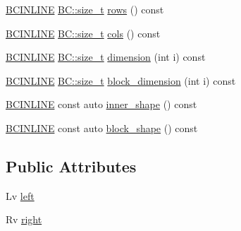\begin{DoxyCompactItemize}
\item 
\hyperlink{BlackCat__Common_8h_a6699e8b0449da5c0fafb878e59c1d4b1}{B\+C\+I\+N\+L\+I\+NE} \hyperlink{namespaceBC_a6007cbc4eeec401a037b558910a56173}{B\+C\+::size\+\_\+t} \hyperlink{structBC_1_1tensors_1_1exprs_1_1Binary__Expression_a4c8338db9038c96551365269e9797a55}{rows} () const 
\item 
\hyperlink{BlackCat__Common_8h_a6699e8b0449da5c0fafb878e59c1d4b1}{B\+C\+I\+N\+L\+I\+NE} \hyperlink{namespaceBC_a6007cbc4eeec401a037b558910a56173}{B\+C\+::size\+\_\+t} \hyperlink{structBC_1_1tensors_1_1exprs_1_1Binary__Expression_aa6792d643387514d8dbf521601686860}{cols} () const 
\item 
\hyperlink{BlackCat__Common_8h_a6699e8b0449da5c0fafb878e59c1d4b1}{B\+C\+I\+N\+L\+I\+NE} \hyperlink{namespaceBC_a6007cbc4eeec401a037b558910a56173}{B\+C\+::size\+\_\+t} \hyperlink{structBC_1_1tensors_1_1exprs_1_1Binary__Expression_ac4ad404ab4c236b4e5346ff2348122ad}{dimension} (int i) const 
\item 
\hyperlink{BlackCat__Common_8h_a6699e8b0449da5c0fafb878e59c1d4b1}{B\+C\+I\+N\+L\+I\+NE} \hyperlink{namespaceBC_a6007cbc4eeec401a037b558910a56173}{B\+C\+::size\+\_\+t} \hyperlink{structBC_1_1tensors_1_1exprs_1_1Binary__Expression_a63d7298dcba7fade6cee9f1ce5f281db}{block\+\_\+dimension} (int i) const 
\item 
\hyperlink{BlackCat__Common_8h_a6699e8b0449da5c0fafb878e59c1d4b1}{B\+C\+I\+N\+L\+I\+NE} const auto \hyperlink{structBC_1_1tensors_1_1exprs_1_1Binary__Expression_a5adc2f7cf2d84733f5ef00a4c778c7da}{inner\+\_\+shape} () const 
\item 
\hyperlink{BlackCat__Common_8h_a6699e8b0449da5c0fafb878e59c1d4b1}{B\+C\+I\+N\+L\+I\+NE} const auto \hyperlink{structBC_1_1tensors_1_1exprs_1_1Binary__Expression_aaca6a6401abf6415c1bc1ee365867160}{block\+\_\+shape} () const 
\end{DoxyCompactItemize}
\subsection*{Public Attributes}
\begin{DoxyCompactItemize}
\item 
Lv \hyperlink{structBC_1_1tensors_1_1exprs_1_1Binary__Expression_a5baf7bcb8cd325e60a99513bd2e4c027}{left}
\item 
Rv \hyperlink{structBC_1_1tensors_1_1exprs_1_1Binary__Expression_af9ec1dff3c9f4684dfdc8a29a3b8d31e}{right}
\end{DoxyCompactItemize}
